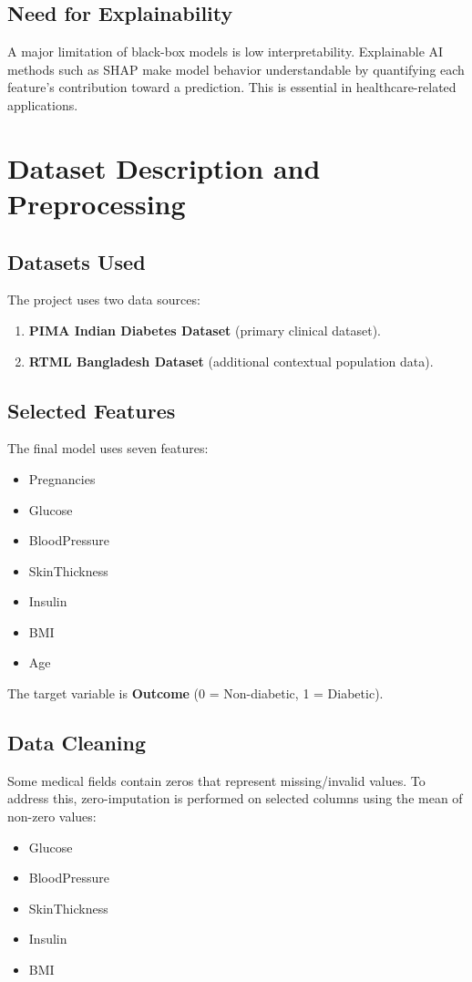 \documentclass[12pt,a4paper]{report}
\begin{document}
\section{Need for Explainability}
A major limitation of black-box models is low interpretability. Explainable AI methods such as SHAP make model behavior understandable by quantifying each feature’s contribution toward a prediction. This is essential in healthcare-related applications.

\chapter{Dataset Description and Preprocessing}

\section{Datasets Used}
The project uses two data sources:
\begin{enumerate}[leftmargin=1.2cm]
    \item \textbf{PIMA Indian Diabetes Dataset} (primary clinical dataset).
    \item \textbf{RTML Bangladesh Dataset} (additional contextual population data).
\end{enumerate}

\section{Selected Features}
The final model uses seven features:
\begin{itemize}[leftmargin=1.2cm]
    \item Pregnancies
    \item Glucose
    \item BloodPressure
    \item SkinThickness
    \item Insulin
    \item BMI
    \item Age
\end{itemize}

The target variable is \textbf{Outcome} (0 = Non-diabetic, 1 = Diabetic).

\section{Data Cleaning}
Some medical fields contain zeros that represent missing/invalid values. To address this, zero-imputation is performed on selected columns using the mean of non-zero values:
\begin{itemize}[leftmargin=1.2cm]
    \item Glucose
    \item BloodPressure
    \item SkinThickness
    \item Insulin
    \item BMI
\end{itemize}
\end{document}
